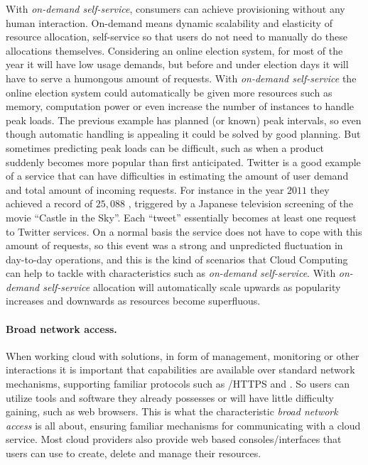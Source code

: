 With \emph{on-demand self-service}, consumers can achieve provisioning without any human interaction.
On-demand means dynamic scalability and elasticity of resource allocation,
self-service so that users do not need to manually do these allocations themselves.
Considering an online election system, for most of the year it will have 
low usage demands, but before and under election days it will have to serve
a humongous amount of requests. With \emph{on-demand self-service} the online election system
could automatically be given more resources such as memory, computation power or even
increase the number of instances to handle peak loads.
The previous example has planned (or known) peak intervals, so even though automatic handling
is appealing it could be solved by good planning. 
But sometimes predicting peak loads can be difficult, such as when a product suddenly
becomes more popular than first anticipated.
Twitter is a good example of a service that can have difficulties in estimating 
the amount of user demand and total amount of incoming requests.
For instance in the year $2011$ they achieved a record of $25,088$ ,
triggered by a Japanese television screening of the movie ``Castle in the Sky''.
Each ``tweet'' essentially becomes at least one request to Twitter services.
On a normal basis the service does not have to cope with this amount of requests, so
this event was a strong and unpredicted fluctuation in day-to-day operations,
and this is the kind of scenarios that Cloud Computing can help to tackle with
characteristics such as \emph{on-demand self-service}.
With \emph{on-demand self-service} allocation will automatically scale upwards as popularity increases 
and downwards as resources become superfluous.

\paragraph{Broad network access.}

When working cloud with solutions, in form of management, monitoring or other 
interactions it is important that capabilities are available over standard network mechanisms,
supporting familiar protocols such as /HTTPS and .
So users can utilize tools and software they already possesses
or will have little difficulty gaining, such as web browsers.
This is what the characteristic \emph{broad network access} is all about,
ensuring familiar mechanisms for communicating with a cloud service.
Most cloud providers also provide web based consoles/interfaces that users can use
to create, delete and manage their resources.

